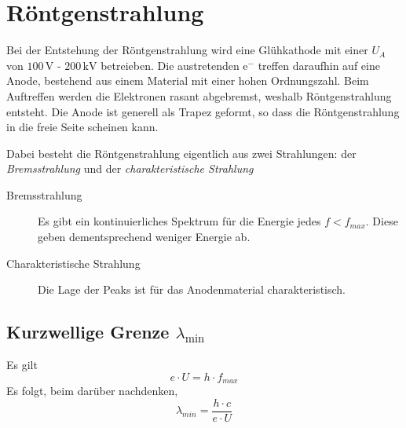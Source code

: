 \documentclass{article}
\begin{document}
\section{Röntgenstrahlung}
Bei der Entstehung der Röntgenstrahlung wird eine Glühkathode mit einer $U_A$ von $100\, \text{V}$ - $200\, \text{kV}$ betreieben. Die austretenden e$^-$ treffen daraufhin auf eine Anode, bestehend aus einem Material mit einer hohen Ordnungszahl. Beim Auftreffen werden die Elektronen rasant abgebremst, weshalb Röntgenstrahlung entsteht. Die Anode ist generell als Trapez geformt, so dass die Röntgenstrahlung in die freie Seite scheinen kann.
 
Dabei besteht die Röntgenstrahlung eigentlich aus zwei Strahlungen: der \emph{Bremsstrahlung} und der \emph{charakteristische Strahlung}
\begin{description} 
 \item[Bremsstrahlung] Es gibt ein kontinuierliches Spektrum für die Energie jedes $f < f_{max}$. Diese geben dementsprechend weniger Energie ab.
 \item[Charakteristische Strahlung] Die Lage der Peaks ist für das Anodenmaterial charakteristisch. 
\end{description} 
 
\subsection{Kurzwellige Grenze $\lambda_{\text{min}}$} 
Es gilt 
\[
 e \cdot U = h \cdot f_{max} 
\]
Es folgt, beim darüber nachdenken,
\[
 \lambda_{min} = \frac{h \cdot c}{e \cdot U} 
\] 
 
\end{document}
